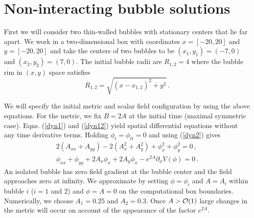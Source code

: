 \documentclass[preprintnumbers,eqsecnum,aps,prd,epsf,showpacs,nofootinbib
]{revtex4}
\begin{document}
\newpage

\section{Non-interacting bubble solutions}
First we will consider two thin-walled bubbles with stationary centers
that lie far apart. We work in a two-dimensional box with coordinates
$x=[-20,20]$ and $y=[-20,20]$ and take the centers of two bubbles to
be $(x_1,y_1)=(-7,0)$ and $(x_2,y_2)=(7,0)$. The initial bubble radii
are $R_{1,2}=4$ where the bubble rim in $(x,y)$ space satisfies
\begin{equation}
R_{1,2}=\sqrt{(x-x_{1,2})^2+y^2}\,.
\end{equation}

We will specify the initial metric and scalar field configuration by
using the above equations. For the metric, we fix $B=2A$ at the
initial time (maximal symmetric case).  Eqns. (\ref{dyn1}) and
(\ref{dyn12}) yield spatial differential equations without any time
derivative terms.  Holding $\phi_t=\phi_{tt}=0$ and using (\ref{dyn2})
gives
\begin{align}
2(A_{xx}+A_{yy})-2(A_x^2+A_y^2)+\phi_x^2+\phi_y^2=0\,,\label{basic-static0}\\
\phi_{xx}+\phi_{yy}+2A_x\phi_x +2A_y\phi_x-e^{2A}\partial_\phi V(\phi)=0\,.
\label{basic-static}
\end{align}
An isolated bubble has zero field gradient at the bubble center and
the field approaches zero at infinity. We approximate by setting
$\phi=\phi_i$ and $A=A_i$ within bubble $i$ ($i=1$ and $2$) and
$\phi=A=0$ on the computational box boundaries.  Numerically, we
choose $A_1=0.25$ and $A_2=0.3$. Once $A>{\cal O}(1)$ large changes in
the metric will occur on account of the appearance of the factor
$e^{2A}$.
\end{document}
